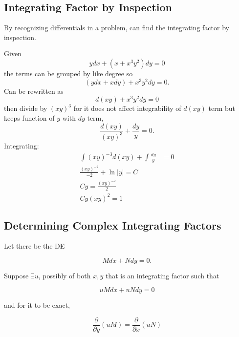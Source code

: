 \subsection{Integrating Factor by Inspection}

By recognizing differentials in a problem, can find the integrating factor by inspection.

\begin{example}
    Given
    \begin{equation}
        ydx+(x+x^3y^2)dy=0
    \end{equation}
    the terms can be grouped by like degree so
    \begin{equation}
        (ydx+xdy)+x^3y^2dy=0.
    \end{equation}
    Can be rewritten as
    \begin{equation}
        d(xy)+x^3y^2dy=0
    \end{equation}
    then divide by $(xy)^3$ for it does not affect integrability of $d(xy)$ term but keeps function of $y$ with $dy$ term,
    \begin{equation}
        \frac{d(xy)}{(xy)^3}+\frac{dy}{y}=0.
    \end{equation}
    Integrating:
    \begin{align}
        \int (xy)^{-3}d(xy)+\int \frac{dy}{y}&=0\\
        \frac{(xy)^{-2}}{-2}+\ln|y|=C\\
        Cy=\frac{(xy)^{-2}}{2}\\
        Cy(xy)^2=1
    \end{align}
\end{example}

\subsection{Determining Complex Integrating Factors}

Let there be the DE

\begin{equation}
    Mdx+Ndy=0.
\end{equation}

Suppose $\exists u$, possibly of both $x,y$ that is an integrating factor such that

\begin{equation}
    uMdx+uNdy=0
\end{equation}

and for it to be exact,

\begin{equation}
    \frac{\partial}{\partial y}(uM)=\frac{\partial}{\partial x}(uN)
\end{equation}

